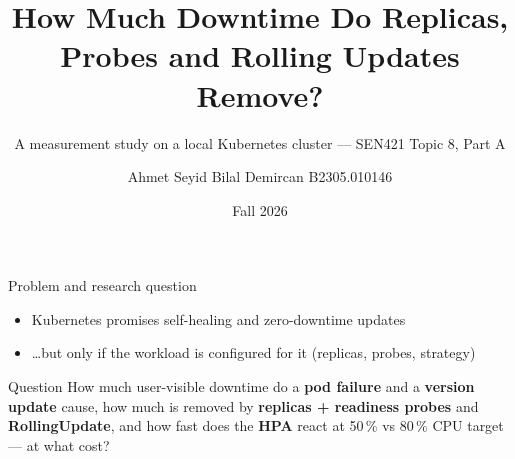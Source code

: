\documentclass[aspectratio=169,11pt]{beamer}
\title{How Much Downtime Do Replicas, Probes and Rolling Updates Remove?}
\subtitle{A measurement study on a local Kubernetes cluster --- SEN421 Topic 8, Part A}
\author{Ahmet Seyid Bilal Demircan \quad B2305.010146}
\institute{Istanbul Ayd\i n University --- SEN421 Cloud Architecture and Services}
\date{Fall 2026}
\begin{document}
\maketitle

\begin{frame}{Problem and research question}
	\begin{itemize}
		\item Kubernetes promises \alert{self-healing} and \alert{zero-downtime updates}
		\item \dots but only if the workload is configured for it (replicas, probes, strategy)
	\end{itemize}
	\vspace{0.6em}
	\begin{block}{Question}
		How much user-visible downtime do a \textbf{pod failure} and a \textbf{version update} cause,
		how much is removed by \textbf{replicas + readiness probes} and \textbf{RollingUpdate},
		and how fast does the \textbf{HPA} react at 50\,\% vs 80\,\% CPU target --- at what cost?
	\end{block}
\end{frame}
\end{document}
